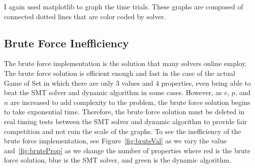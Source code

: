 \documentclass[pageno]{jpaper}
\begin{document}
I again used matplotlib to graph the time trials. These graphs are composed of connected dotted lines that are color coded by solver. 
\subsection{Brute Force Inefficiency}

The brute force implementation is the solution that many solvers online employ. The brute force solution is efficient enough and fast in the case of the actual Game of Set in which there are only $3$ values and $4$ properties, even being able to beat the SMT solver and dynamic algorithm in some cases. However, as $v$, $p$, and $n$ are increased to add complexity to the problem, the brute force solution begins to take exponential time. Therefore, the brute force solution must be deleted in real timing tests between the SMT solver and dynamic algorithm to provide fair competition and not ruin the scale of the graphs. To see the inefficiency of the brute force implementation, see Figure~\ref{fig:bruteVal} as we vary the value and~\ref{fig:bruteProp} as we change the number of properties where red is the brute force solution, blue is the SMT solver, and green is the dynamic algorithm.
\end{document}
